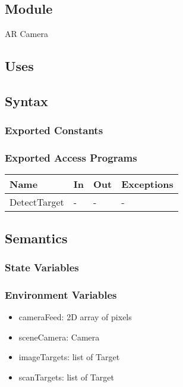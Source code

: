 \documentclass[12pt, titlepage]{article}
\begin{document}
\subsection{Module}

AR Camera

\subsection{Uses}

\subsection{Syntax}

\subsubsection{Exported Constants}

\subsubsection{Exported Access Programs}

\begin{center}
\begin{tabular}{p{2cm} p{4cm} p{4cm} p{2cm}}
\hline
\textbf{Name} & \textbf{In} & \textbf{Out} & \textbf{Exceptions} \\
\hline
DetectTarget & - & - & - \\

\hline
\end{tabular}
\end{center}

\subsection{Semantics}

\subsubsection{State Variables}

\subsubsection{Environment Variables}

\begin{itemize}
\item cameraFeed: 2D array of pixels
\item sceneCamera: Camera
\item imageTargets: list of Target
\item scanTargets: list of Target
\end{itemize}
\end{document}
